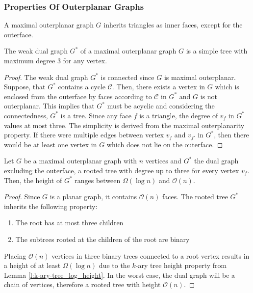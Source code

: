 \subsubsection{Properties Of Outerplanar Graphs}
\begin{lemma}
	A maximal outerplanar graph $G$ inherits triangles as inner faces, except for the outerface.
\end{lemma}
\begin{lemma}\label{l:outerplanar-dual-tree-degree-3}
	The weak dual graph $G^*$ of a maximal outerplanar graph $G$ is a simple tree with maximum degree 3 for any vertex.
\end{lemma}
\begin{proof}
	The weak dual graph $G^*$ is connected since $G$ is maximal outerplanar. Suppose, that $G^*$ contains a cycle $\mathcal{C}$. Then, there exists a vertex in $G$ which is enclosed from the outerface by faces according to $\mathcal{C}$ in $G^*$ and $G$ is not outerplanar. This implies that $G^*$ must be acyclic and considering the connectedness, $G^*$ is a tree. Since any face $f$ is a triangle, the degree of $v_f$ in $G^*$ values at most three. The simplicity is derived from the maximal outerplanarity property. If there were multiple edges between vertex $v_f$ and $v_{f'}$ in $G^*$, then there would be at least one vertex in $G$ which does not lie on the outerface.
\end{proof}
\begin{lemma}
	Let $G$ be a maximal outerplanar graph with $n$ vertices and $G^*$ the dual graph excluding the outerface, a rooted tree with degree up to three for every vertex $v_f$. Then, the height of $G^*$ ranges between $\Omega(\log n)$ and $\mathcal{O}(n)$.
\end{lemma}
\begin{proof}
	Since $G$ is a planar graph, it contains $\mathcal{O}(n)$ faces. The rooted tree $G^*$ inherits the following property:
	\begin{enumerate}
		\item The root has at most three children
		\item The subtrees rooted at the children of the root are binary
	\end{enumerate}
	Placing $\mathcal{O}(n)$ vertices in three binary trees connected to a root vertex results in a height of at least $\Omega(\log n)$ due to the $k$-ary tree height property from Lemma \ref{l:k-ary-tree_log_height}. In the worst case, the dual graph will be a chain of vertices, therefore a rooted tree with height $\mathcal{O}(n)$.
\end{proof}

